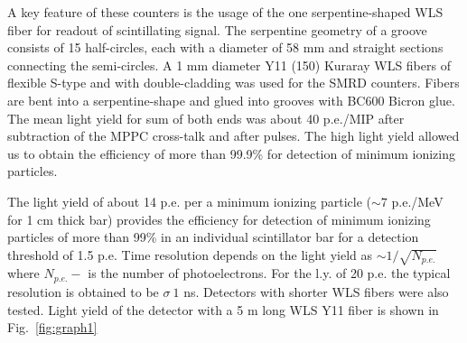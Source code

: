 A key feature of   these counters is the usage of the one serpentine-shaped WLS fiber for readout of scintillating signal.   The serpentine geometry of a groove consists of 15 half-circles, each with a diameter of 58 mm and straight sections connecting the semi-circles. A 1 mm diameter Y11 (150) Kuraray WLS fibers of flexible S-type and with double-cladding was used for the SMRD counters. Fibers are bent into a serpentine-shape and glued into grooves with BC600 Bicron glue.
The mean light yield for sum of both ends  was about 40 p.e./MIP after subtraction of the MPPC cross-talk and after pulses. The high light yield allowed us to obtain the efficiency of more than 99.9\% for detection of  minimum ionizing particles.

%
The light yield of about 14 p.e. per a minimum ionizing particle ($\sim 7$ p.e./MeV for 1 cm thick bar) provides the efficiency  for detection of minimum ionizing particles of more than  99\% in an individual scintillator bar  for a detection threshold of 1.5 p.e.  Time resolution depends on the  light yield as $\sim 1/\sqrt{N_{p.e.}}$ where $N_{p.e.}-$ is the number of photoelectrons. For the l.y. of 20 p.e. the typical resolution  is obtained to be $\sigma ~ 1$ ns. Detectors with shorter WLS fibers were also tested. 
Light yield of the detector with a 5 m long WLS  Y11 fiber is shown in Fig.~\ref{fig:graph1}

